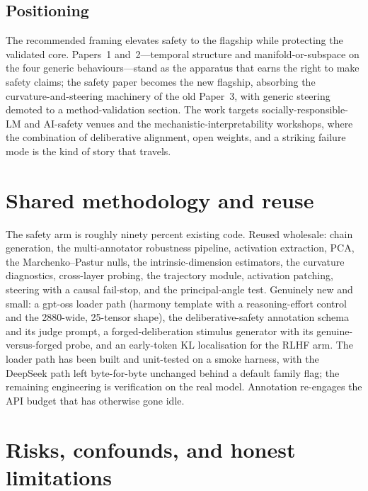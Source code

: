 \documentclass[10pt]{article}
\begin{document}
\subsection{Positioning}

The recommended framing elevates safety to the flagship while protecting the
validated core. Papers~1 and~2---temporal structure and manifold-or-subspace on the
four generic behaviours---stand as the apparatus that earns the right to make safety
claims; the safety paper becomes the new flagship, absorbing the
curvature-and-steering machinery of the old Paper~3, with generic steering demoted to
a method-validation section. The work targets socially-responsible-LM and AI-safety
venues and the mechanistic-interpretability workshops, where the combination of
deliberative alignment, open weights, and a striking failure mode is the kind of
story that travels.

\section{Shared methodology and reuse}
\label{sec:methods}

The safety arm is roughly ninety percent existing code. Reused wholesale: chain
generation, the multi-annotator robustness pipeline, activation extraction, PCA, the
Marchenko--Pastur nulls, the intrinsic-dimension estimators, the curvature
diagnostics, cross-layer probing, the trajectory module, activation patching, steering
with a causal fail-stop, and the principal-angle test. Genuinely new and small: a
gpt-oss loader path (harmony template with a reasoning-effort control and the
2880-wide, 25-tensor shape), the deliberative-safety annotation schema and its judge
prompt, a forged-deliberation stimulus generator with its genuine-versus-forged probe,
and an early-token KL localisation for the RLHF arm. The loader path has been built
and unit-tested on a smoke harness, with the DeepSeek path left byte-for-byte
unchanged behind a default family flag; the remaining engineering is verification on
the real model. Annotation re-engages the API budget that has otherwise gone idle.

\section{Risks, confounds, and honest limitations}
\label{sec:risks}
\end{document}
